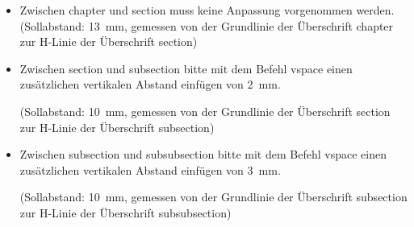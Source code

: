 \begin{itemize}
\item \justifying Zwischen \glqq chapter\grqq{} und \glqq section\grqq{} muss keine Anpassung vorgenommen werden. (Sollabstand: 13~mm, gemessen von der Grundlinie der Überschrift \glqq chapter\grqq{} zur H-Linie der Überschrift \glqq section\grqq{}) 

\item \raggedright Zwischen \glqq section\grqq{} und \glqq subsection\grqq{} bitte mit dem Befehl \glqq vspace\grqq{} einen zusätzlichen vertikalen Abstand einfügen von 2~mm. 


(Sollabstand: 10~mm, gemessen von der Grundlinie der Überschrift \glqq section\grqq{} zur H-Linie der Überschrift \glqq subsection\grqq{})

\item \raggedright Zwischen \glqq subsection\grqq{} und \glqq subsubsection\grqq{} bitte mit dem Befehl \glqq vspace\grqq{} einen zusätzlichen vertikalen Abstand einfügen von 3~mm. 


(Sollabstand: 10~mm, gemessen von der Grundlinie der Überschrift \glqq subsection\grqq{} zur H-Linie der Überschrift \glqq subsubsection\grqq{}) 
\end{itemize}


